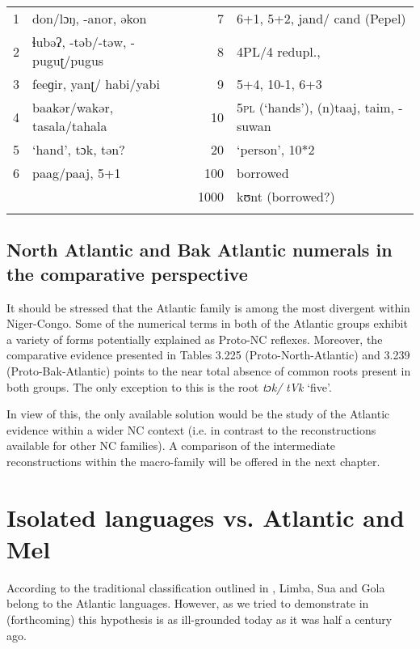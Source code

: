 {\begin{table}
\begin{tabularx}{\textwidth}{ll@{}rQ}
1 & don/lɔŋ, -anor, əkon & 7 & 6+1, 5+2, jand/ cand (Pepel)\\
2 & ɬubəʔ, -təb/-təw, -puguʈ/pugus & 8 & 4PL/4 redupl., \\
3 & feeɡir, yanʈ/ habi/yabi & 9 & 5+4, 10-1, 6+3\\
4 & baakər/wakər, tasala/tahala & 10 & 5\textsc{pl} (‘hands’), (n)taaj, taim, -suwan\\
5 & ‘hand’, tɔk, tən? & 20 & ‘person’, 10*2\\
6 & paag/paaj, 5+1 & 100 & borrowed\\
&  & 1000 & kʊnt (borrowed?)\\
\lspbottomrule
\end{tabularx}
\end{table}

 
\subsection{North Atlantic and Bak Atlantic numerals in the comparative perspective}%
It should be stressed that the Atlantic family is among the most divergent within Niger-Congo. Some of the numerical terms in both of the Atlantic groups exhibit a variety of forms potentially explained as Proto-NC reflexes. Moreover, the comparative evidence presented in Tables 3.225 (Proto-North-Atlantic) and 3.239 (Proto-Bak-Atlantic) points to the near total absence of common roots present in both groups. The only exception to this is the root \textit{tɔk/} \textit{tVk} ‘five’.

In view of this, the only available solution would be the study of the Atlantic evidence within a wider NC context (i.e. in contrast to the reconstructions available for other NC families). A comparison of the intermediate reconstructions within the macro-family will be offered in the next chapter.
\clearpage
\section{Isolated languages vs. Atlantic and Mel}%

According to the traditional classification outlined in \citealt{Sapir1971}, Limba, Sua and Gola belong to the Atlantic languages. However, as we tried to demonstrate in \citealt{PozdniakovSegerer2017} (forthcoming) this hypothesis is as ill-grounded today as it was half a century ago. 

}

